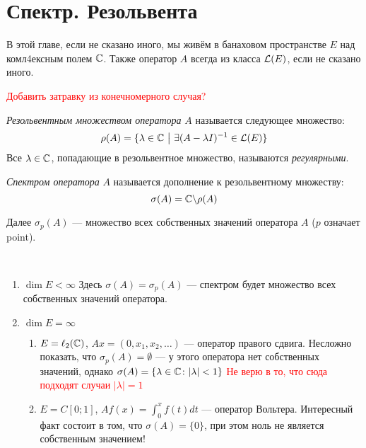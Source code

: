 \section{Спектр. Резольвента}

\begin{note}
	В этой главе, если не сказано иного, мы живём в банаховом пространстве $E$ над комл4ексным полем $\mathbb{C}$. Также оператор $A$ всегда из класса $\mathcal{L}(E)$, если не сказано иного.
\end{note}

\textcolor{red}{Добавить затравку из конечномерного случая?}

\begin{definition}
	\textit{Резольвентным множеством оператора} $A$ называется следующее множество:
	\[
		\rho(A) = \{\lambda \in \mathbb{C} \ \big|\  \exists (A - \lambda I)^{-1} \in \mathcal{L}(E)\}
	\]
	Все $\lambda \in \mathbb{C}$, попадающие в резольвентное множество, называются \textit{регулярными}.
\end{definition}

\begin{definition}
	\textit{Спектром оператора} $A$ называется дополнение к резольвентному множеству:
	\[
		\sigma(A) = \mathbb{C} \backslash \rho(A)
	\]
\end{definition}

\begin{note}
	Далее $\sigma_p(A)$ --- множество всех собственных значений оператора $A$ ($p$ означает point).
\end{note}

\begin{example}~
	\begin{enumerate}
		\item $\dim E < \infty$ Здесь $\sigma(A) = \sigma_p(A)$ --- спектром будет множество всех собственных значений оператора.
		
		\item $\dim E = \infty$
		\begin{enumerate}
			\item $E = \ell_2(\mathbb{C})$, $Ax = (0, x_1, x_2, \ldots)$ --- оператор правого сдвига. Несложно показать, что $\sigma_p(A) = \emptyset$ --- у этого оператора нет собственных значений, однако   $\sigma(A) = \{\lambda \in \mathbb{C} \colon |\lambda| < 1\}$ \textcolor{red}{Не верю в то, что сюда подходят случаи $|\lambda| = 1$}
			
			\item $E = C[0; 1]$, $Af(x) = \int_0^x f(t)dt$ --- оператор Вольтера. Интересный факт состоит в том, что $\sigma(A) = \{0\}$, при этом ноль не является собственным значением!
		\end{enumerate}
	\end{enumerate}
\end{example}


